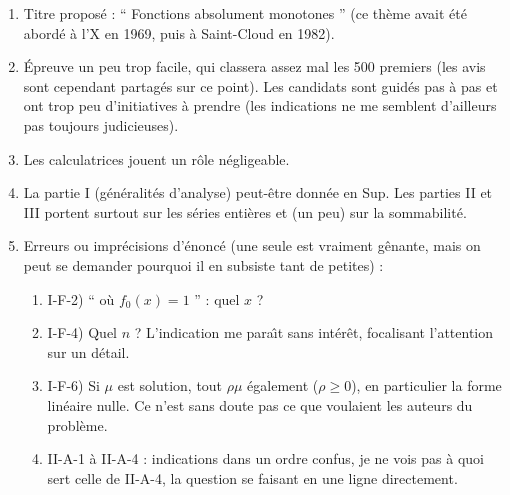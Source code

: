 \documentclass[a4paper]{article}
\begin{document}
\begin{enumerate}
\item

  Titre propos\'e : `` Fonctions absolument monotones '' (ce th\`eme avait
\'et\'e abord\'e \`a l'X en  1969, puis \`a Saint-Cloud en 1982).

\item

	\'Epreuve un peu trop facile, qui classera assez mal les 500
premiers (les avis sont cependant partag\'es sur ce point). Les
candidats sont guid\'es pas \`a pas et ont trop peu d'initiatives \`a
prendre (les indications ne me semblent d'ailleurs pas toujours
judicieuses).

\item

	Les calculatrices jouent un r\^ole n\'egligeable.

\item

	La partie I (g\'en\'eralit\'es d'analyse) peut-\^etre donn\'ee en Sup. Les
parties II et III portent surtout sur les s\'eries enti\`eres et (un peu)
sur la sommabilit\'e.

\item

  Erreurs ou impr\'ecisions d'\'enonc\'e (une seule est vraiment g\^enante,
mais on peut se demander pourquoi il en subsiste tant de petites) :

  \begin{enumerate}
%																																			

   \item
   I-F-2) `` o\`u $f_0(x)=1$ '' : quel $x$ ?

	\item
   I-F-4) Quel $n$ ? L'indication me para\^{\i}t sans int\'er\^et, focalisant
   l'attention sur un d\'etail.

	\item
	I-F-6) Si $\mu$ est solution, tout $\rho \mu$ \'egalement
	($\rho\ge0$), en particulier la forme lin\'eaire nulle. Ce n'est sans
	doute pas ce que voulaient les auteurs du probl\`eme.

	\item
	II-A-1 \`a II-A-4 : indications dans un ordre confus, je ne vois pas \`a
	quoi sert celle de II-A-4, la question se faisant en une ligne
	directement.


\end{enumerate}
\end{enumerate}
\end{document}
